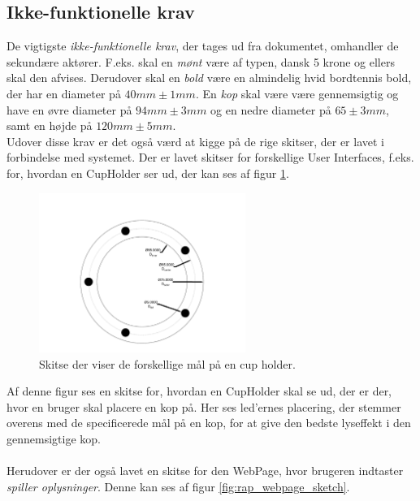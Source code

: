 \documentclass[Rapport/Rapport_main.tex]{subfiles}
\begin{document}
\subsection{Ikke-funktionelle krav}
De vigtigste \textit{ikke-funktionelle krav}, der tages ud fra dokumentet, omhandler de sekundære aktører. F.eks. skal en \textit{mønt} være af typen, dansk 5 krone og ellers skal den afvises. 
Derudover skal en \textit{bold} være en almindelig hvid bordtennis bold, der har en diameter på $40mm \pm{1mm}$.
En \textit{kop} skal være være gennemsigtig og have en øvre diameter på $94mm \pm{3mm}$ og en nedre diameter på $65 \pm{3mm}$, samt en højde på $120mm \pm{5mm}$.\\
Udover disse krav er det også værd at kigge på de rige skitser, der er lavet i forbindelse med systemet. Der er lavet skitser for forskellige User Interfaces, f.eks. for, hvordan en CupHolder ser ud, der kan ses af figur \ref{fig:rap_LEDplacement}.
\begin{figure}[H]
    \centering
    \includegraphics[width=0.6\textwidth,trim={2in 0.4in 2in 1.3in},clip, page=1]{Kravspecifikation/Ikke-funktionelle/graphics/LEDplacement.pdf}
    \caption{Skitse der viser de forskellige mål på en cup holder.}
    \label{fig:rap_LEDplacement}
\end{figure}
Af denne figur ses en skitse for, hvordan en CupHolder skal se ud, der er der, hvor en bruger skal placere en kop på. Her ses led'ernes placering, der stemmer overens med de specificerede mål på en kop, for at give den bedste lyseffekt i den gennemsigtige kop.\\\\
Herudover er der også lavet en skitse for den WebPage, hvor brugeren indtaster \textit{spiller oplysninger}. Denne kan ses af figur \ref{fig:rap_webpage_sketch}.
\end{document}
